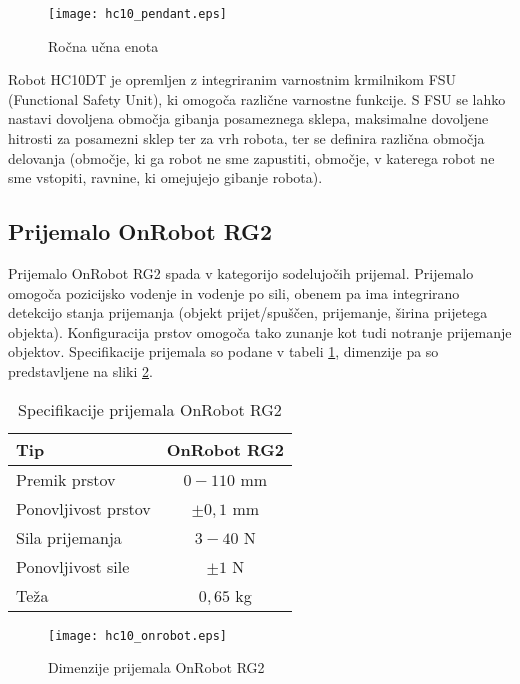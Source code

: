 \begin{figure}[!hbt]
	\centering
	\texttt{[image: hc10\_pendant.eps]}
	\caption{Ročna učna enota}
	\label{fig:hc10_pendant}
\end{figure}

Robot HC10DT je opremljen z integriranim varnostnim krmilnikom FSU (Functional Safety Unit), ki omogoča različne varnostne funkcije. S FSU se lahko nastavi dovoljena območja gibanja posameznega sklepa, maksimalne dovoljene hitrosti za posamezni sklep ter za vrh robota, ter se definira različna območja delovanja (območje, ki ga robot ne sme zapustiti, območje, v katerega robot ne sme vstopiti, ravnine, ki omejujejo gibanje robota).

\subsection{Prijemalo OnRobot RG2}

Prijemalo OnRobot RG2 spada v kategorijo sodelujočih prijemal. Prijemalo omogoča pozicijsko vodenje in vodenje po sili, obenem pa ima integrirano detekcijo stanja prijemanja (objekt prijet/spuščen, prijemanje, širina prijetega objekta). Konfiguracija prstov omogoča tako zunanje kot tudi notranje prijemanje objektov. Specifikacije prijemala so podane v tabeli \ref{tab:RG2}, dimenzije pa so predstavljene na sliki \ref{fig:hc10_onrobot}.

\begin{table}
	\centering
	\caption{Specifikacije prijemala OnRobot RG2}
	\label{tab:RG2}
	\begin{tabular}{|l|c|}
		\hline Tip                  & OnRobot RG2 \\
		\hline Premik prstov        & $0-110$ mm \\
		\hline Ponovljivost prstov   & $\pm 0,1$ mm \\
		\hline Sila prijemanja      & $3-40$ N \\
		\hline Ponovljivost sile    & $\pm 1$ N \\
		\hline Teža                 & $0,65$ kg \\
		\hline
	\end{tabular}
\end{table}


\begin{figure}[!hbt]
	\centering
	\texttt{[image: hc10\_onrobot.eps]}
	\caption{Dimenzije prijemala OnRobot RG2}
	\label{fig:hc10_onrobot}
\end{figure}


